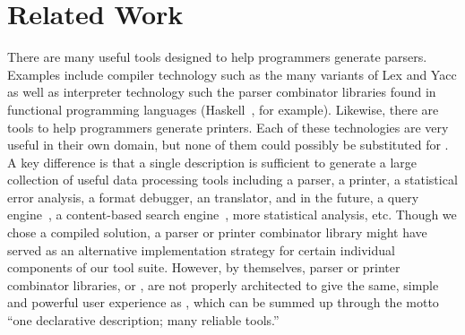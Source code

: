 \section{Related Work}
\label{sec:related}

There are many useful tools designed to help programmers generate
parsers.  Examples include compiler technology such as the many
variants of Lex and Yacc as well as interpreter technology such the
parser combinator libraries found in functional programming languages
(Haskell~\cite{hutton+:parser-combinators}, for example).  Likewise,
there are tools to help programmers generate printers.  Each of these
technologies are very useful in their own domain, but none of them
could possibly be substituted for \padsml{}.  A key difference is that
a single \padsml{} description is sufficient to generate a large
collection of useful data processing tools including a parser, a
printer, a statistical error analysis, a format debugger, an \xml{}
translator, and in the future, a query engine~\cite{fernandez+:padx},
a content-based search engine~\cite{lv+:cbs,oh:siw}, more statistical
analysis, etc.  Though we chose a compiled solution, a parser or
printer combinator library might have served as an alternative
implementation strategy for certain individual components of our tool
suite.  However, by themselves, parser or printer combinator
libraries, \lex{} or \yacc, are not properly architected to give the
same, simple and powerful user experience as \padsml{}, which can be
summed up through the motto ``one declarative description; many
reliable tools.''


